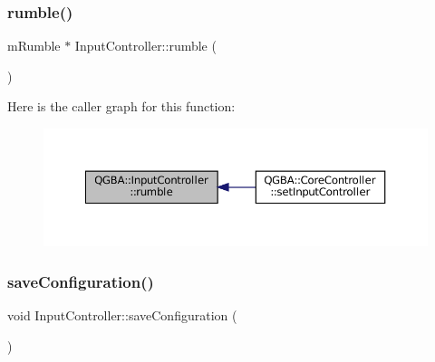 \subsubsection{\texorpdfstring{rumble()}{rumble()}}
{\footnotesize\ttfamily m\+Rumble $\ast$ Input\+Controller\+::rumble (\begin{DoxyParamCaption}{ }\end{DoxyParamCaption})}

Here is the caller graph for this function\+:
\nopagebreak
\begin{figure}[H]
\begin{center}
\leavevmode
\includegraphics[width=350pt]{class_q_g_b_a_1_1_input_controller_a178e6dee0c72e0aa7fc5c10d48541703_icgraph}
\end{center}
\end{figure}
\mbox{\label{class_q_g_b_a_1_1_input_controller_a2adb9fc74465b49f0730fdcf034e05bd}} 
\subsubsection{\texorpdfstring{save\+Configuration()}{saveConfiguration()}\hspace{0.1cm}{\footnotesize\ttfamily [1/2]}}
{\footnotesize\ttfamily void Input\+Controller\+::save\+Configuration (\begin{DoxyParamCaption}{ }\end{DoxyParamCaption})}

